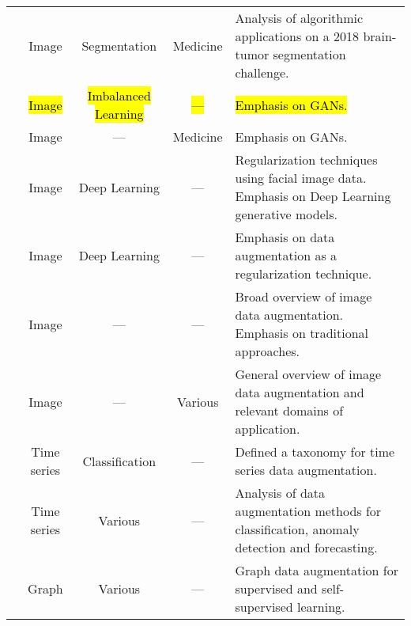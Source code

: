 \begin{table}[t!]
\begin{tabularx}{\textwidth}{@{}rcccX@{}}
        \cite{nalepa2019data} & Image & Segmentation & Medicine & Analysis of
        algorithmic applications on a 2018 brain-tumor segmentation
        challenge.\\

        \cite{sampath2021survey} & \hl{Image} & \hl{Imbalanced Learning} &
        \hl{---} & \hl{Emphasis on GANs.} \\

        \cite{yi2019generative} & Image & --- & Medicine & Emphasis on GANs.\\

        \cite{wang2020survey} & Image & Deep Learning & --- & Regularization
        techniques using facial image data. Emphasis on Deep Learning
        generative models.\\

        \cite{shorten2019survey} & Image & Deep Learning & --- & Emphasis on
        data augmentation as a regularization technique.\\

        \cite{khosla2020enhancing} & Image & --- & --- & Broad overview of
        image data augmentation. Emphasis on traditional approaches. \\

        \cite{khalifa2021comprehensive} & Image & --- & Various & General
        overview of image data augmentation and relevant domains of
        application.\\

        \cite{iwana2021empirical} & Time series & Classification & --- &
        Defined a taxonomy for time series data augmentation.\\

        \cite{wen2020time} & Time series & Various & --- & Analysis of data
        augmentation methods for classification, anomaly detection and
        forecasting.\\

        \cite{zhao2022graph} & Graph & Various & --- & Graph data
        augmentation for supervised and self-supervised learning.\\

        \bottomrule
        
    \end{tabularx}
\end{table}
\endgroup

